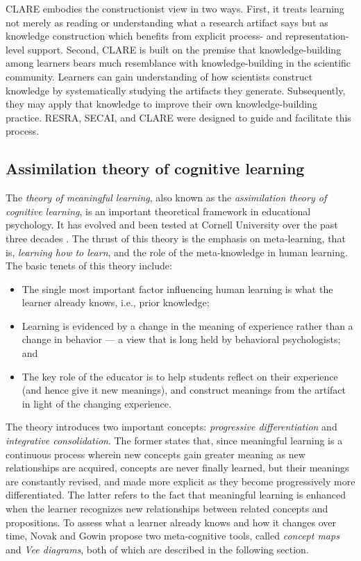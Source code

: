 CLARE embodies the constructionist view in two ways. First, it treats
learning not merely as reading or understanding what a research artifact
says but as knowledge construction which benefits from explicit process-
and representation-level support.  Second, CLARE is built on the premise
that knowledge-building among learners bears much resemblance with
knowledge-building in the scientific community. Learners can gain
understanding of how scientists construct knowledge by systematically
studying the artifacts they generate. Subsequently, they may apply that
knowledge to improve their own knowledge-building practice.  RESRA, SECAI,
and CLARE were designed to guide and facilitate this process.


\subsection{Assimilation theory of cognitive learning}

The {\it theory of meaningful learning\/}, also known as the {\it
assimilation theory of cognitive learning\/}, is an important theoretical
framework in educational psychology. It has evolved and been tested at
Cornell University over the past three decades \cite{Ausubel63,Novak84}.
The thrust of this theory is the emphasis on meta-learning, that is, {\it
learning how to learn\/}, and the role of the meta-knowledge in human
learning.  The basic tenets of this theory include:

\begin{itemize}
\item The single most important factor influencing human learning is what
  the learner already knows, i.e., prior knowledge;
  
\item Learning is evidenced by a change in the meaning of experience
  rather than a change in behavior --- a view that is long held by
  behavioral psychologists; and
  
\item The key role of the educator is to help students reflect on their
  experience (and hence give it new meanings), and construct meanings from
  the artifact in light of the changing experience.
\end{itemize}

The theory introduces two important concepts: {\it progressive
differentiation\/} and {\it integrative consolidation\/}. The former states
that, since meaningful learning is a continuous process wherein new
concepts gain greater meaning as new relationships are acquired, concepts
are never finally learned, but their meanings are constantly revised, and
made more explicit as they become progressively more differentiated.  The
latter refers to the fact that meaningful learning is enhanced when the
learner recognizes new relationships between related concepts and 
propositions. To assess what a learner already knows and how it changes
over time, Novak and Gowin \cite{Novak84} propose two meta-cognitive tools,
called {\it concept maps\/} and {\it Vee diagrams\/}, both of which are
described in the following section.

